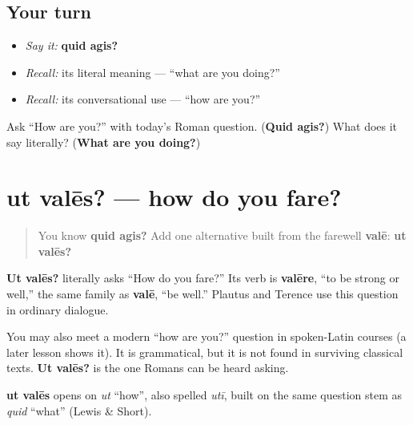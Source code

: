 \subsection*{Your turn}
\begin{itemize}
\raggedright
  \item \emph{Say it:} \textbf{quid agis?}
  \item \emph{Recall:} its literal meaning — “what are you doing?”
  \item \emph{Recall:} its conversational use — “how are you?”
\end{itemize}

\begin{tcolorbox}[breakable,colback=teal!4,colframe=teal!35!black,title={Before you move on}]
Ask “How are you?” with today’s Roman question. (\textbf{Quid agis?}) What does it say literally? (\textbf{What are you doing?})
\end{tcolorbox}
\section[ut valēs?]{ut valēs? — how do you fare?}

\label{lesson:LA-C19-ut-vales}



\begin{quote}
You know \textbf{quid agis?} Add one alternative built from the farewell \textbf{valē}: \textbf{ut valēs?}
\end{quote}

\begin{culture}
\textbf{Ut valēs?} literally asks “How do you fare?” Its verb is \textbf{valēre}, “to be strong or well,” the same family as \textbf{valē}, “be well.” Plautus and Terence use this question in ordinary dialogue.

You may also meet a modern \textquotedblleft{}how are you?\textquotedblright{} question in spoken-Latin courses (a later lesson shows it). It is grammatical, but it is not found in surviving classical texts. \textbf{Ut valēs?} is the one Romans can be heard asking.
\end{culture}

\begin{cousinweb}
\textbf{ut valēs} opens on \emph{ut} \textquotedblleft{}how\textquotedblright{}, also spelled \emph{utī}, built on the same question stem as \emph{quid} \textquotedblleft{}what\textquotedblright{} (Lewis \& Short).
\end{cousinweb}

